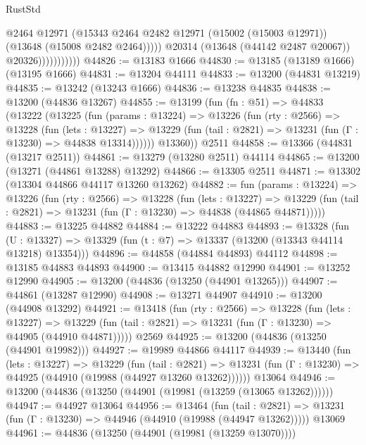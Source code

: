 \begin{lexlean}{RustStd}
\begin{coremodule}
                              @2464
                              @12971
                              (@15343
                                @2464
                                @2482
                                @12971
                                (@15002 (@15003 @12971))
                                (@13648 (@15008 @2482 @2464)))))
                          @20314
                          (@13648 (@44142 @2487 @20067))
                          @20326)))))))))))
@44826 := @13183 @1666
@44830 := @13185 (@13189 @1666) (@13195 @1666)
@44831 := @13204 @44111
@44833 := @13200 (@44831 @13219)
@44835 := @13242 (@13243 @1666)
@44836 := @13238 @44835
@44838 := @13200 (@44836 @13267)
@44855 := @13199
    (fun (fn : @51) =>
    @44833
      (@13222
        (@13225
          (fun (params : @13224) =>
          @13226
            (fun (rty : @2566) =>
            @13228
              (fun (lets : @13227) =>
              @13229 (fun (tail : @2821) => @13231 (fun (Γ : @13230) => @44838 @13314))))))
        @13360))
    @2511
@44858 := @13366 (@44831 (@13217 @2511))
@44861 := @13279 (@13280 @2511) @44114
@44865 := @13200 (@13271 (@44861 @13288) @13292)
@44866 := @13305 @2511
@44871 := @13302 (@13304 @44866 @44117 @13260 @13262)
@44882 := fun (params : @13224) =>
  @13226
    (fun (rty : @2566) =>
    @13228
      (fun (lets : @13227) =>
      @13229 (fun (tail : @2821) => @13231 (fun (Γ : @13230) => @44838 (@44865 @44871)))))
@44883 := @13225 @44882
@44884 := @13222 @44883
@44893 := @13328
    (fun (U : @13327) => @13329 (fun (t : @7) => @13337 (@13200 (@13343 @44114 @13218) @13354)))
@44896 := @44858 (@44884 @44893) @44112
@44898 := @13185 @44883 @44893
@44900 := @13415 @44882 @12990
@44901 := @13252 @12990
@44905 := @13200 (@44836 (@13250 (@44901 @13265)))
@44907 := @44861 (@13287 @12990)
@44908 := @13271 @44907
@44910 := @13200 (@44908 @13292)
@44921 := @13418
    (fun (rty : @2566) =>
    @13228
      (fun (lets : @13227) =>
      @13229 (fun (tail : @2821) => @13231 (fun (Γ : @13230) => @44905 (@44910 @44871)))))
    @2569
@44925 := @13200 (@44836 (@13250 (@44901 @19982)))
@44927 := @19989 @44866 @44117
@44939 := @13440
    (fun (lets : @13227) =>
    @13229
      (fun (tail : @2821) =>
      @13231 (fun (Γ : @13230) => @44925 (@44910 (@19988 (@44927 @13260 @13262))))))
    @13064
@44946 := @13200 (@44836 (@13250 (@44901 (@19981 (@13259 (@13065 @13262))))))
@44947 := @44927 @13064
@44956 := @13464
    (fun (tail : @2821) => @13231 (fun (Γ : @13230) => @44946 (@44910 (@19988 (@44947 @13262)))))
    @13069
@44961 := @44836 (@13250 (@44901 (@19981 (@13259 @13070))))

\end{coremodule}
\end{lexlean}
